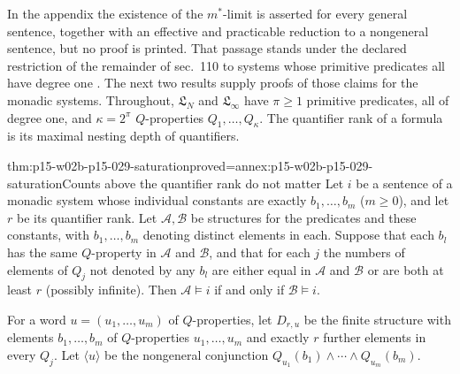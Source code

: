 In the appendix the existence of the \(m^*\)-limit is asserted for
every general sentence, together with an effective and practicable
reduction to a nongeneral sentence, but no proof is printed. That
passage stands under the declared restriction of the remainder of
sec.~110 to systems whose primitive predicates all have degree one
\cite[sec.~110A, pp.~566--567]{Carnap1950Probability}. The next two
results supply proofs of those claims for the monadic systems.
Throughout, \(\mathfrak L_N\) and \(\mathfrak L_\infty\) have
\(\pi\geq1\) primitive predicates, all of degree one, and
\(\kappa=2^\pi\) \(Q\)-properties \(Q_1,\ldots,Q_\kappa\). The
quantifier rank of a formula is its maximal nesting depth of quantifiers.

\begin{hblemma}{thm:p15-w02b-p15-029-saturation}{proved=annex:p15-w02b-p15-029-saturation}{Counts above the quantifier rank do not matter}
Let \(i\) be a sentence of a monadic system whose individual constants
are exactly \(b_1,\ldots,b_m\) (\(m\geq0\)), and let \(r\) be its
quantifier rank. Let \(\mathcal A,\mathcal B\) be structures for the
predicates and these constants, with \(b_1,\ldots,b_m\) denoting
distinct elements in each. Suppose that each \(b_l\) has the same
\(Q\)-property in \(\mathcal A\) and \(\mathcal B\), and that for
each \(j\) the numbers of elements of \(Q_j\) not denoted by any
\(b_l\) are either equal in \(\mathcal A\) and \(\mathcal B\) or are
both at least \(r\) (possibly infinite). Then
\(\mathcal A\models i\) if and only if \(\mathcal B\models i\).
\end{hblemma}

For a word \(u=(u_1,\ldots,u_m)\) of \(Q\)-properties, let
\(D_{r,u}\) be the finite structure with elements \(b_1,\ldots,b_m\)
of \(Q\)-properties \(u_1,\ldots,u_m\) and exactly \(r\) further
elements in every \(Q_j\). Let \(\langle u\rangle\) be the nongeneral
conjunction \(Q_{u_1}(b_1)\land\cdots\land Q_{u_m}(b_m)\).

